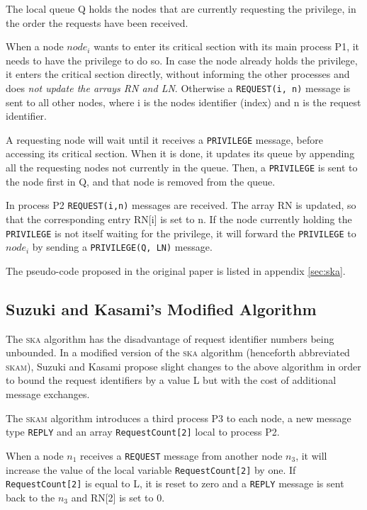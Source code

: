 \documentclass[a4paper,10pt]{llncs}
\begin{document}
The local queue Q holds the nodes that are currently requesting the privilege, in the order the requests have been received.

When a node $node_i$ wants to enter its critical section with its main process P1, it needs to have the privilege to do so. In case the node already holds the privilege, it enters the critical section directly, without informing the other processes and does \emph{not update the arrays RN and LN}. Otherwise a \texttt{REQUEST(i, n)} message is sent to all other nodes, where i is the nodes identifier (index) and n is the request identifier.

A requesting node will wait until it receives a \texttt{PRIVILEGE} message, before accessing its critical section. When it is done, it updates its queue by appending all the requesting nodes not currently in the queue. Then, a \texttt{PRIVILEGE} is sent to the node first in Q, and that node is removed from the queue.

In process P2 \texttt{REQUEST(i,n)} messages are received. The array RN is updated, so that the corresponding entry RN[i] is set to n. If the node currently holding the \texttt{PRIVILEGE} is not itself waiting for the privilege, it will forward the \texttt{PRIVILEGE} to $node_i$ by sending a \texttt{PRIVILEGE(Q, LN)} message.

The pseudo-code proposed in the original paper is listed in appendix \ref{sec:ska}.

\subsection{Suzuki and Kasami's Modified Algorithm}
The \textsc{ska} algorithm has the disadvantage of request identifier numbers being unbounded. In a modified version of the \textsc{ska} algorithm (henceforth abbreviated \textsc{skam}), Suzuki and Kasami propose slight changes to the above algorithm in order to bound the request identifiers by a value L but with the cost of additional message exchanges.

The \textsc{skam} algorithm introduces a third process P3 to each node, a new message type \texttt{REPLY} and an array \texttt{RequestCount[2]} local to process P2.

When a node $n_1$ receives a \texttt{REQUEST} message from another node $n_3$, it will increase the value of the local variable \texttt{RequestCount[2]} by one. If \texttt{RequestCount[2]} is equal to L, it is reset to zero and a \texttt{REPLY} message is sent back to the $n_3$ and RN[2] is set to 0.
\end{document}

